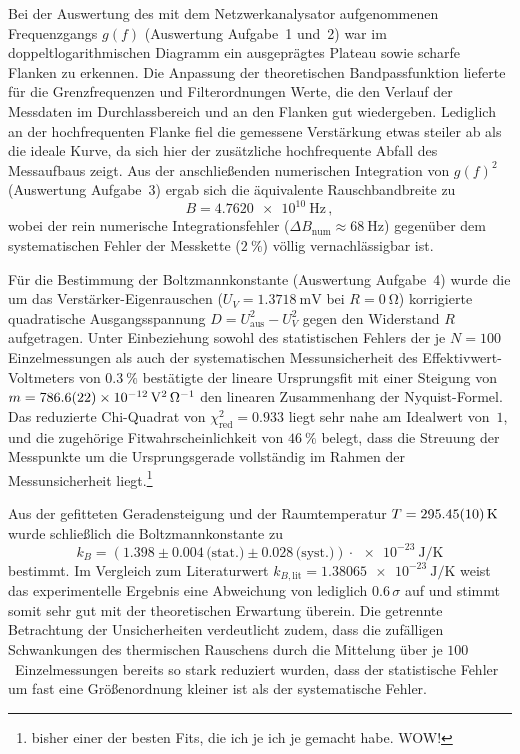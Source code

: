 \documentclass[12pt,a4paper,titlepage]{scrartcl}
\numberwithin{equation}{section}
\numberwithin{table}{section}
\numberwithin{figure}{section}
\begin{document}
\medskip
Bei der Auswertung des mit dem Netzwerkanalysator aufgenommenen Frequenzgangs $g(f)$ (Auswertung Aufgabe~1 und~2) war im doppeltlogarithmischen Diagramm ein ausgeprägtes Plateau sowie scharfe Flanken zu erkennen. Die Anpassung der theoretischen Bandpassfunktion lieferte für die Grenzfrequenzen und Filterordnungen Werte, die den Verlauf der Messdaten im Durchlassbereich und an den Flanken gut wiedergeben. Lediglich an der hochfrequenten Flanke fiel die gemessene Verstärkung etwas steiler ab als die ideale Kurve, da sich hier der zusätzliche hochfrequente Abfall des Messaufbaus zeigt. Aus der anschließenden numerischen Integration von $g(f)^2$ (Auswertung Aufgabe~3) ergab sich die äquivalente Rauschbandbreite zu
\begin{equation*}
    B = \SI{4.7620e10}{\hertz} \,,
\end{equation*}
wobei der rein numerische Integrationsfehler ($\Delta B_{\text{num}} \approx \SI{68}{\hertz}$) gegenüber dem systematischen Fehler der Messkette ($\SI{2}{\percent}$) völlig vernachlässigbar ist.

\medskip
Für die Bestimmung der Boltzmannkonstante (Auswertung Aufgabe~4) wurde die um das Verstärker-Eigenrauschen ($U_V = \SI{1.3718}{\milli\volt}$ bei $R = \SI{0}{\ohm}$) korrigierte quadratische Ausgangsspannung $D = U_{\text{aus}}^2 - U_V^2$ gegen den Widerstand $R$ aufgetragen. Unter Einbeziehung sowohl des statistischen Fehlers der je $N = 100$ Einzelmessungen als auch der systematischen Messunsicherheit des Effektivwert-Voltmeters von $\SI{0.3}{\percent}$ bestätigte der lineare Ursprungsfit mit einer Steigung von $m = \SI{786.6 +- 2.2e-12}{\volt\squared\per\ohm}$ den linearen Zusammenhang der Nyquist-Formel. Das reduzierte Chi-Quadrat von $\chi^2_{\text{red}} = \num{0.933}$ liegt sehr nahe am Idealwert von~$1$, und die zugehörige Fitwahrscheinlichkeit von $\SI{46}{\percent}$ belegt, dass die Streuung der Messpunkte um die Ursprungsgerade vollständig im Rahmen der Messunsicherheit liegt.\footnote{bisher einer der besten Fits, die ich je ich je gemacht habe. WOW!}

\medskip
Aus der gefitteten Geradensteigung und der Raumtemperatur $T = \SI{295.45 +- 0.10}{\kelvin}$ wurde schließlich die Boltzmannkonstante zu
\begin{equation*}
    k_B = \left(\num{1.398} \pm \num{0.004}\,\text{(stat.)} \pm \num{0.028}\,\text{(syst.)}\right) \cdot \SI{e-23}{\joule\per\kelvin}
\end{equation*}
bestimmt. Im Vergleich zum Literaturwert $k_{B,\text{lit}} = \SI{1.38065e-23}{\joule\per\kelvin}$ weist das experimentelle Ergebnis eine Abweichung von lediglich $\num{0.6}\,\sigma$ auf und stimmt somit sehr gut mit der theoretischen Erwartung überein. Die getrennte Betrachtung der Unsicherheiten verdeutlicht zudem, dass die zufälligen Schwankungen des thermischen Rauschens durch die Mittelung über je $100$~Einzelmessungen bereits so stark reduziert wurden, dass der statistische Fehler um fast eine Größenordnung kleiner ist als der systematische Fehler.
\end{document}
